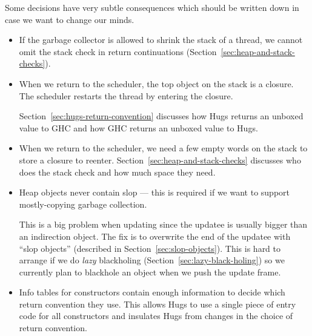 \documentclass[11pt]{article}
\newcommand{\secref}[1]{Section~\ref{sec:#1}}
\begin{document}
Some decisions have very subtle consequences which should be written
down in case we want to change our minds.  

\begin{itemize}

\item

If the garbage collector is allowed to shrink the stack of a thread,
we cannot omit the stack check in return continuations
(\secref{heap-and-stack-checks}).

\item

When we return to the scheduler, the top object on the stack is a closure.
The scheduler restarts the thread by entering the closure.

\secref{hugs-return-convention} discusses how Hugs returns an
unboxed value to GHC and how GHC returns an unboxed value to Hugs.

\item 

When we return to the scheduler, we need a few empty words on the stack
to store a closure to reenter.  \secref{heap-and-stack-checks}
discusses who does the stack check and how much space they need.

\item

Heap objects never contain slop --- this is required if we want to
support mostly-copying garbage collection.

This is a big problem when updating since the updatee is usually
bigger than an indirection object.  The fix is to overwrite the end of
the updatee with ``slop objects'' (described in
\secref{slop-objects}).  This is hard to arrange if we do
\emph{lazy} blackholing (\secref{lazy-black-holing}) so we
currently plan to blackhole an object when we push the update frame.


\item

Info tables for constructors contain enough information to decide which
return convention they use.  This allows Hugs to use a single piece of
entry code for all constructors and insulates Hugs from changes in the
choice of return convention.

\end{itemize}
\end{document}

